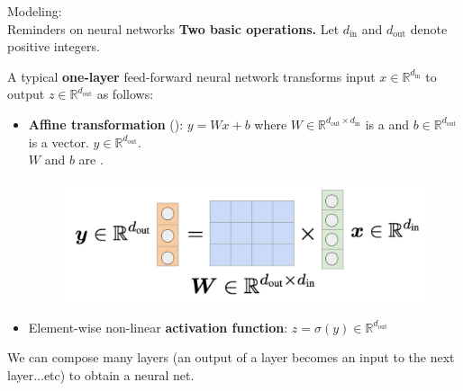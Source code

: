 \begin{frame}{Modeling:\\Reminders on neural networks}
\textbf{Two basic operations.} Let $d_\text{in}$ and $d_\text{out}$ denote positive integers.

A typical \textbf{one-layer} feed-forward neural network transforms input $x\in\mathbb{R}^{d_\text{in}}$ to output $z\in\mathbb{R}^{d_\text{out}}$ as follows:
\begin{itemize}
\item \textbf{Affine transformation} (): $y = Wx + b$ where $W\in\mathbb{R}^{d_\text{out} \times d_\text{in}}$ is a  and $b\in\mathbb{R}^{d_\text{out}}$ is a  vector.
$y\in\mathbb{R}^{d_\text{out}}$.\\
$W$ and $b$ are .
\begin{figure}
\centering
\includegraphics[width=0.80\linewidth]{./figures/linear.png}
\end{figure}
\pause
\item Element-wise non-linear \textbf{activation function}: $z = \sigma(y) \in\mathbb{R}^{d_\text{out}}$
\pause
\end{itemize}
We can compose many layers (an output of a layer becomes an input to the next layer...etc) to obtain a  neural net.
\end{frame}

